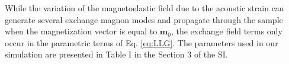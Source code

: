 \documentclass[%
superscriptaddress,
preprint,
showpacs,
amsmath,
amssymb,
aps,
prl,
]{revtex4-1}
\begin{document}
While the variation of the magnetoelastic field due to the acoustic strain can generate several exchange magnon modes and propagate through the sample when the magnetization vector is equal to $\mathbf{m}_0$,
the exchange field terms only occur in the parametric terms of Eq. \eqref{eq:LLG}.
The parameters used in our simulation are presented in Table I in the Section 3 of the SI.
\end{document}
